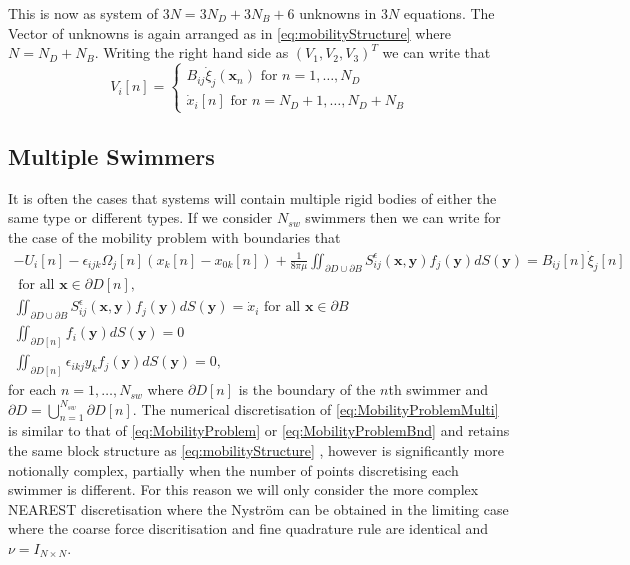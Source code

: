 This is now as system of $3N = 3N_D+3N_B + 6$ unknowns in $3N$ equations. The Vector of unknowns is again arranged as in \cref{eq:mobilityStructure} where $N=N_D+N_B$. Writing the right hand side as $(V_1,V_2,V_3)^T$ we can write that
\begin{equation*}
    V_i[n] = \begin{cases} B_{i j} \dot{\xi}_{j}({\bm{x}}_{n}) \text{ for } n=1,\dots,N_D \\ \dot{x}_i[n] \text{ for } n=N_D+1,\dots,N_D+N_B \end{cases}
\end{equation*}

\subsection{Multiple Swimmers} \label{sec:multipleSwimmers}
It is often the cases that systems will contain multiple rigid bodies of either the same type or different types. If we consider $N_{sw}$ swimmers then we can write for the case of the mobility problem with boundaries that
\begin{equation}
\label{eq:MobilityProblemMulti}
\begin{gathered}
    -U_{i}[n]-\epsilon_{i j k} \Omega_{j}[n]\left(x_{k}[n]-x_{0 k}[n]\right)+\frac{1}{8 \pi\mu} \iint_{\partial D \cup \partial B} S_{i j}^{\epsilon}(\bm{x}, \bm{y}) f_{j}(\bm{y}) d S({\bm{y}})=B_{i j}[n] \dot{\xi}_{j}[n] \\ \text { for all } \bm{x} \in \partial D[n], \\
    \iint_{\partial D \cup \partial B} S_{i j}^{\epsilon}(\bm{x}, \bm{y}) f_{j}(\bm{y}) d S({\bm{y}}) = \dot{x}_i \text { for all } \bm{x} \in \partial B \\
    \iint_{\partial D[n]} f_{i}(\bm{y}) d S({\bm{y}})=0 \\
    \iint_{\partial D[n]} \epsilon_{i k j} y_{k} f_{j}(\bm{y}) d S({\bm{y}})=0,
\end{gathered}
\end{equation}
for each $n=1,\dots,N_{sw}$ where $\partial D[n]$ is the boundary of the $n$th swimmer and $\partial D = \bigcup_{n=1}^{N_{sw}} \partial D[n]$. The numerical discretisation of \cref{eq:MobilityProblemMulti} is similar to that of  \cref{eq:MobilityProblem} or \cref{eq:MobilityProblemBnd} and retains the same block structure as \cref{eq:mobilityStructure} , however is significantly more notionally complex, partially when the number of points discretising each swimmer is different. For this reason we will only consider the more complex NEAREST discretisation where the Nyström can be obtained in the limiting case where the coarse force discritisation and fine quadrature rule are identical and $\nu = I_{N \times N}$.

